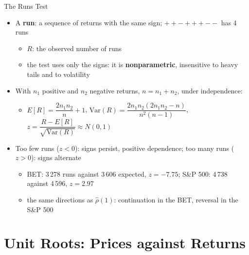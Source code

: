 \begin{frame}{The Runs Test}
\itemsize{\small}
\begin{itemize}
    \item A \textbf{run}: a sequence of returns with the same sign; $+ + - + + + - -$ has 4 runs 
    \begin{itemize}
        \item $R$: the observed number of runs
        \item the test uses only the signs: it is \textbf{nonparametric}, insensitive to heavy tails and to volatility
    \end{itemize}
    \item With $n_1$ positive and $n_2$ negative returns, $n = n_1 + n_2$, under independence:
    \begin{itemize}
        \item $E[R] = \dfrac{2n_1n_2}{n} + 1$, \quad $\mathrm{Var}(R) = \dfrac{2n_1n_2(2n_1n_2 - n)}{n^2(n-1)}$, \quad $z = \dfrac{R - E[R]}{\sqrt{\mathrm{Var}(R)}} \approx N(0, 1)$
    \end{itemize}
    \item Too few runs ($z < 0$): signs persist, positive dependence; too many runs ($z > 0$): signs alternate
    \begin{itemize}
        \item BET: 3\,278 runs against 3\,606 expected, $z = -7.75$; S\&P 500: 4\,738 against 4\,596, $z = 2.97$
        \item the same directions as $\hat\rho(1)$: continuation in the BET, reversal in the S\&P 500
    \end{itemize}
\end{itemize}
\end{frame}


\section{Unit Roots: Prices against Returns}

